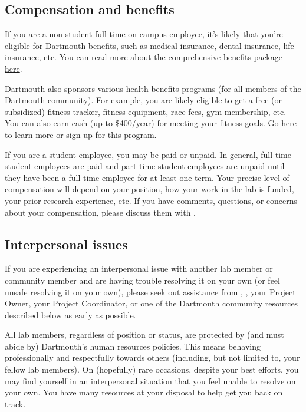 \documentclass{tufte-book} %
\begin{document}
\subsection{Compensation and benefits}
If you are a non-student full-time on-campus employee, it's likely that
you're eligible for Dartmouth benefits, such as medical insurance,
dental insurance, life insurance, etc.  You can read more about the
comprehensive benefits package \href{http://www.dartmouth.edu/~hrs/benefits/}{here}.

Dartmouth also sponsors various health-benefits programs (for all
members of the Dartmouth community).  For example, you are likely
eligible to get a free (or subsidized) fitness tracker, fitness
equipment, race fees, gym membership, etc.  You can also earn cash (up
to \$400/year) for meeting your fitness goals.  Go
\href{http://join.virginpulse.com/dartmouth/}{here} to learn more or
sign up for this program.

If you are a student employee, you may be paid or unpaid.  In general,
full-time student employees are paid and part-time student employees
are unpaid until they have been a full-time employee for at least one
term.  Your precise level of compensation will depend on your
position, how your work in the lab is funded, your prior research
experience, etc.  If you have comments, questions, or concerns about
your compensation, please discuss them with \director.

\subsection{Interpersonal issues}
If you are experiencing an interpersonal issue with another lab member
or community member and are having trouble resolving it on your own (or feel
unsafe resolving it on your own), please seek out assistance from
\director, \coordinator, your Project Owner, your Project Coordinator,
or one of the Dartmouth community resources described below as early
as possible.

All lab members, regardless of position or status, are protected by
(and must abide by) Dartmouth's human resources policies.  This means
behaving professionally and respectfully towards others (including,
but not limited to, your fellow lab members).  On (hopefully) rare
occasions, despite your best efforts, you may find yourself in an
interpersonal situation that you feel unable to resolve on your own.
You have many resources at your disposal to help get you back on
track.
\end{document}
